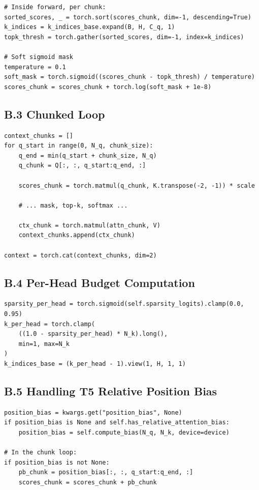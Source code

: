 \begin{lstlisting}
# Inside forward, per chunk:
sorted_scores, _ = torch.sort(scores_chunk, dim=-1, descending=True)
k_indices = k_indices_base.expand(B, H, C_q, 1)
topk_thresh = torch.gather(sorted_scores, dim=-1, index=k_indices)

# Soft sigmoid mask
temperature = 0.1
soft_mask = torch.sigmoid((scores_chunk - topk_thresh) / temperature)
scores_chunk = scores_chunk + torch.log(soft_mask + 1e-8)
\end{lstlisting}

\subsection{B.3 Chunked Loop}

\begin{lstlisting}
context_chunks = []
for q_start in range(0, N_q, chunk_size):
    q_end = min(q_start + chunk_size, N_q)
    q_chunk = Q[:, :, q_start:q_end, :]
    
    scores_chunk = torch.matmul(q_chunk, K.transpose(-2, -1)) * scale
    
    # ... mask, top-k, softmax ...
    
    ctx_chunk = torch.matmul(attn_chunk, V)
    context_chunks.append(ctx_chunk)

context = torch.cat(context_chunks, dim=2)
\end{lstlisting}

\subsection{B.4 Per-Head Budget Computation}

\begin{lstlisting}
sparsity_per_head = torch.sigmoid(self.sparsity_logits).clamp(0.0, 0.95)
k_per_head = torch.clamp(
    ((1.0 - sparsity_per_head) * N_k).long(),
    min=1, max=N_k
)
k_indices_base = (k_per_head - 1).view(1, H, 1, 1)
\end{lstlisting}

\subsection{B.5 Handling T5 Relative Position Bias}

\begin{lstlisting}
position_bias = kwargs.get("position_bias", None)
if position_bias is None and self.has_relative_attention_bias:
    position_bias = self.compute_bias(N_q, N_k, device=device)

# In the chunk loop:
if position_bias is not None:
    pb_chunk = position_bias[:, :, q_start:q_end, :]
    scores_chunk = scores_chunk + pb_chunk
\end{lstlisting}

